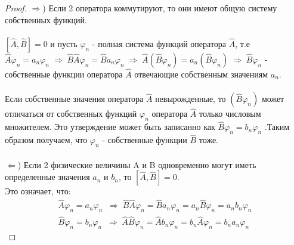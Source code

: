 \documentclass[__main__.tex]{subfiles}
\begin{document}
\begin{proof}
    $\Rightarrow$) Если 2 оператора коммутируют, то они имеют общую систему собственных функций.\\\\
    $[\hat{A},\hat{B}]=0$ и пусть ${\varphi_n}$ - полная система функций оператора $\hat{A}$, т.е $\hat{A}\varphi_n = a_n\varphi_n \; \Rightarrow \; \hat{B}\hat{A}\varphi_n = \hat{B}a_n\varphi_n \; \Rightarrow \; \hat{A}(\hat{B}\varphi_n) = a_n(\hat{B}\varphi_n) \; \Rightarrow \; \hat{B}\varphi_n$ - собственные функции оператора $\hat{A}$ отвечающие собственным значениям $a_n$.  \\\\

    Если собственные значения оператора $\hat{A}$ невырожденные, то $(\hat{B}\varphi_n)$ может отличаться от собственных функций $\varphi_n$ оператора $\hat{A}$ только числовым множителем. Это утверждение может быть записанно как $\hat{B}\varphi_n = b_n\varphi_n$ .Таким образом получаем, что $\varphi_n$ - собственные функции $\hat{B}$ тоже.\\\\
    $\Leftarrow$) Если 2 физические величины A и B одновременно могут иметь определенные значения $a_n$ и $b_n$, то $[\hat{A},\hat{B}] = 0$.\\

    Это означает, что:
    \begin{gather*}
        \hat{A}\varphi_n = a_n\varphi_n \;\; \Rightarrow \; \hat{B}\hat{A}\varphi_n=\hat{B}a_n\varphi_n=a_n\hat{B}\varphi_n=a_nb_n\varphi_n\\
        \hat{B}\varphi_n = b_n\varphi_n \;\; \Rightarrow \;
        \hat{A}\hat{B}\varphi_n=\hat{A}b_n\varphi_n = b_n\hat{A}\varphi_n = b_na_n\varphi_n
    \end{gather*}
\end{proof}
\end{document}
